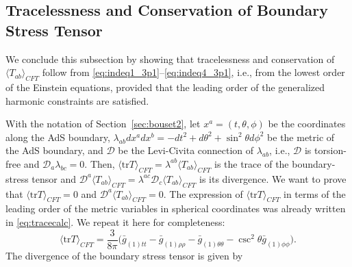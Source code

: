 \documentclass[aps,letterpaper,twocolumn,nofootinbib]{revtex4}
\numberwithin{equation}{section}
\begin{document}
\subsection{Tracelessness and Conservation of Boundary Stress Tensor}

We conclude this subsection by showing that tracelessness and conservation of $\langle T_{ab}\rangle_{CFT}$ follow from \eqref{eq:indeq1_3p1}--\eqref{eq:indeq4_3p1}, i.e., from the lowest order of the Einstein equations, provided that the leading order of the generalized harmonic constraints are satisfied. 

With the notation of Section~\ref{sec:bouset2}, let $x^a=(t,\theta,\phi)$ be the coordinates along the AdS boundary, $\lambda_{ab}dx^a dx^b=-dt^2+d\theta^2+\sin^2\theta d\phi^2$ be the metric of the AdS boundary, and $\mathcal{D}$ be the Levi-Civita connection of $\lambda_{ab}$, i.e., $\mathcal{D}$ is torsion-free and $\mathcal{D}_a\lambda_{bc}=0$. Then, $\langle \text{tr}T\rangle_{CFT}=\lambda^{ab}\langle T_{ab}\rangle_{CFT}$ is the trace of the boundary-stress tensor and $\mathcal{D}^a \langle T_{ab}\rangle_{CFT}=\lambda^{ac}\mathcal{D}_c \langle T_{ab}\rangle_{CFT}$ is its divergence. 
We want to prove that $\langle \text{tr}T\rangle_{CFT}=0$ and $\mathcal{D}^a \langle T_{ab}\rangle_{CFT}=0$. 
The expression of $\langle \text{tr}T\rangle_{CFT}$ in terms of the leading order of the metric variables in spherical coordinates was already written in \eqref{eq:tracecalc}. We repeat it here for completeness:
\begin{equation}
\label{eq:tracecalc2}
\langle \text{tr}T\rangle_{CFT}=\frac{3}{8\pi}\biggl(\bar{g}_{(1)tt}-\bar{g}_{(1)\rho\rho}-\bar{g}_{(1)\theta\theta}-\csc ^2\theta \bar{g}_{(1)\phi\phi}\biggr).
\end{equation}
The divergence of the boundary stress tensor is given by
\end{document}
